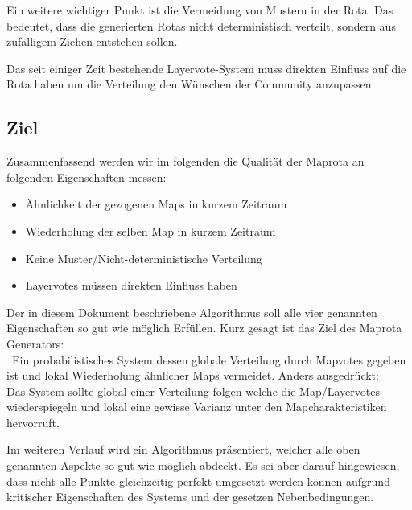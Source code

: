             Ein weitere wichtiger Punkt ist die Vermeidung von Mustern in der Rota. 
            Das bedeutet, dass die generierten Rotas nicht deterministisch verteilt, sondern aus zufälligem Ziehen entstehen sollen.
            
            Das seit einiger Zeit bestehende Layervote-System muss direkten Einfluss auf die Rota haben um die Verteilung den Wünschen der Community anzupassen.

        \subsection{Ziel}
            Zusammenfassend werden wir im folgenden die Qualität der Maprota an folgenden Eigenschaften messen:
            \begin{itemize}
                \item Ähnlichkeit der gezogenen Maps in kurzem Zeitraum
                \item Wiederholung der selben Map in kurzem Zeitraum
                \item Keine Muster/Nicht-deterministische Verteilung 
                \item Layervotes müssen direkten Einfluss haben 
            \end{itemize}

            Der in diesem Dokument beschriebene Algorithmus soll alle vier genannten Eigenschaften so gut wie möglich Erfüllen.
            Kurz gesagt ist das Ziel des Maprota Generators:\\\
            \glqq{}Ein probabilistisches System dessen globale Verteilung durch Mapvotes gegeben ist und lokal Wiederholung ähnlicher Maps vermeidet.\grqq{}
            Anders ausgedrückt:\\
            Das System sollte global einer Verteilung folgen welche die Map/Layervotes wiederspiegeln und lokal eine gewisse Varianz unter den Mapcharakteristiken hervorruft.

            Im weiteren Verlauf wird ein Algorithmus präsentiert, welcher alle oben genannten Aspekte so gut wie möglich abdeckt. 
            Es sei aber darauf hingewiesen, dass nicht alle Punkte gleichzeitig perfekt umgesetzt werden können aufgrund kritischer Eigenschaften des Systems und der gesetzen Nebenbedingungen.
